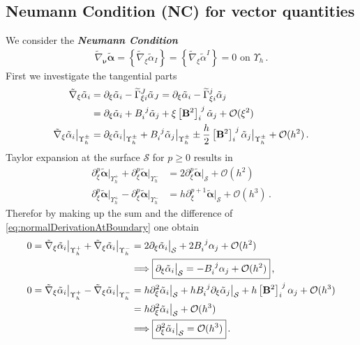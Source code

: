 \documentclass[a4paper,11pt]{scrartcl}
\newcommand{\surf}{\mathcal{S}}
\newcommand{\landau}{\mathcal{O}}
\newcommand{\nub}{\bm{\nu}}
\newcommand{\Bb}{\mathbf{B}}
\newcommand{\alphab}{\bm{\alpha}}
\newcommand{\talphab}{\tilde{\alphab}}
\newcommand{\talpha}{\tilde{\alpha}}
\newcommand{\tnabla}{\tilde{\nabla}}
\newcommand{\tch}[2]{\widetilde{\Gamma}_{#1}^{#2}}
\newcommand{\boundary}[1]{\Upsilon_{h}^{#1}}
\newcommand{\AtBoundary}[1]{\big|_{\boundary{#1}}}
\newcommand{\AtSurface}{\big|_{\surf}}
\newcommand{\formComma}{\,\text{,}}
\newcommand{\formPeriod}{\,\text{.}}
\newcommand{\newterm}[1]{\textbf{\textit{#1}}}
\begin{document}
  \subsection{Neumann Condition (NC) for vector quantities}
    We consider the \newterm{Neumann Condition}
    \begin{align}
      \tnabla_{\nub}\talphab = \left\{ \tnabla_{\xi}\talpha_{I} \right\} = \left\{ \tnabla_{\xi}\talpha^{I} \right\} = 0 \text{ on }\boundary{} \formPeriod
      \tag{NPC}
    \end{align}
    First we investigate the tangential parts 
    \begin{align}
      \tnabla_{\xi}\talpha_{i} 
              &= \partial_{\xi}\talpha_{i} - \tch{\xi i}{J}\talpha_{J} 
              = \partial_{\xi}\talpha_{i} - \tch{\xi i}{j}\talpha_{j}\\
              &= \partial_{\xi}\talpha_{i} + \tensor{B}{_{i}^{j}}\talpha_{j} + \xi\tensor{\left[ \Bb^{2} \right]}{_{i}^{j}}\talpha_{j} + \landau(\xi^{2})\\
      \tnabla_{\xi}\talpha_{i}\AtBoundary{\pm}
              &= \partial_{\xi}\talpha_{i}\AtBoundary{\pm} + \tensor{B}{_{i}^{j}}\talpha_{j}\AtBoundary{\pm} 
                      \pm \frac{h}{2} \tensor{\left[ \Bb^{2} \right]}{_{i}^{j}}\talpha_{j}\AtBoundary{\pm} + \landau(h^{2}) \formPeriod \label{eq:normalDerivationAtBoundary}
    \end{align}
    Taylor expansion at the surface \( \surf \) for \( p \ge 0 \) results in
    \begin{align}
      \partial_{\xi}^{p}\talphab\AtBoundary{+} + \partial_{\xi}^{p}\talphab\AtBoundary{-}
          &= 2\partial_{\xi}^{p}\talphab\AtSurface + \landau(h^{2}) \\
      \partial_{\xi}^{p}\talphab\AtBoundary{+} - \partial_{\xi}^{p}\talphab\AtBoundary{-}
          &= h \partial_{\xi}^{p+1}\talphab\AtSurface + \landau(h^{3}) \formPeriod
    \end{align}
    Therefor by making up the sum and the difference of \eqref{eq:normalDerivationAtBoundary} one obtain 
    \begin{align}
      0 = \tnabla_{\xi}\talpha_{i}\AtBoundary{+} + \tnabla_{\xi}\talpha_{i}\AtBoundary{-}
          &= 2\partial_{\xi}\talpha_{i}\AtSurface + 2\tensor{B}{_{i}^{j}}\alpha_{j} + \landau(h^{2})\\
          &\Longrightarrow \boxed{\partial_{\xi}\talpha_{i}\AtSurface = - \tensor{B}{_{i}^{j}}\alpha_{j} + \landau(h^{2})} \formComma \label{eq:NeumannFirstOrderFlat}\\
      0 = \tnabla_{\xi}\talpha_{i}\AtBoundary{+} - \tnabla_{\xi}\talpha_{i}\AtBoundary{-}
          &= h\partial_{\xi}^{2}\talpha_{i}\AtSurface + h\tensor{B}{_{i}^{j}}\partial_{\xi}\talpha_{j}\AtSurface + h\tensor{\left[ \Bb^{2} \right]}{_{i}^{j}}\alpha_{j} + \landau(h^{3})\\
          &= h\partial_{\xi}^{2}\talpha_{i}\AtSurface + \landau(h^{3})\\
        &\Longrightarrow \boxed{\partial_{\xi}^{2}\talpha_{i}\AtSurface = \landau(h^{3})} \formPeriod \label{eq:NeumannSecondOrderFlat}
    \end{align}
\end{document}
